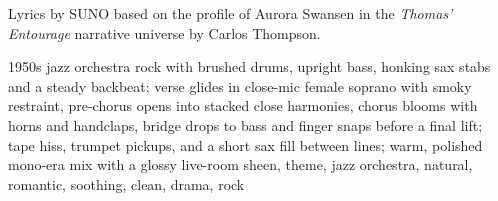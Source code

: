 
\begin{notes}
Lyrics by SUNO based on the profile of Aurora Swansen in the \emph{Thomas’ Entourage} narrative universe by Carlos Thompson.
\end{notes}
\begin{style}
1950s jazz orchestra rock with brushed drums, upright bass, honking sax stabs and a steady backbeat; verse glides in close-mic female soprano with smoky restraint, pre-chorus opens into stacked close harmonies, chorus blooms with horns and handclaps, bridge drops to bass and finger snaps before a final lift; tape hiss, trumpet pickups, and a short sax fill between lines; warm, polished mono-era mix with a glossy live-room sheen, theme, jazz orchestra, natural, romantic, soothing, clean, drama, rock
\end{style}
